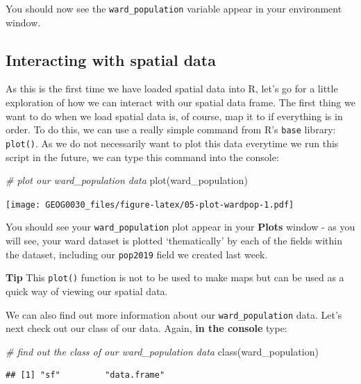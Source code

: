 \documentclass[
]{book}
\newenvironment{Shaded}{\begin{snugshade}}{\end{snugshade}}
\newcommand{\CommentTok}[1]{\textcolor[rgb]{0.56,0.35,0.01}{\textit{#1}}}
\newcommand{\FunctionTok}[1]{\textcolor[rgb]{0.00,0.00,0.00}{#1}}
\newcommand{\NormalTok}[1]{#1}
\begin{document}
You should now see the \texttt{ward\_population} variable appear in your environment window.

\hypertarget{interacting-with-spatial-data}{%
\subsection{Interacting with spatial data}\label{interacting-with-spatial-data}}

As this is the first time we have loaded spatial data into R, let's go for a little exploration of how we can interact with our spatial data frame. The first thing we want to do when we load spatial data is, of course, map it to if everything is in order. To do this, we can use a really simple command from R's \texttt{base} library: \texttt{plot()}. As we do not necessarily want to plot this data everytime we run this script in the future, we can type this command into the console:

\begin{Shaded}
\begin{Highlighting}[]
\CommentTok{\# plot our ward\_population data}
\FunctionTok{plot}\NormalTok{(ward\_population)}
\end{Highlighting}
\end{Shaded}

\texttt{[image: GEOG0030\_files/figure-latex/05-plot-wardpop-1.pdf]}

You should see your \texttt{ward\_population} plot appear in your \textbf{Plots} window - as you will see, your ward dataset is plotted `thematically' by each of the fields within the dataset, including our \texttt{pop2019} field we created last week.

\textbf{Tip}
This \texttt{plot()} function is not to be used to make maps but can be used as a quick way of viewing our spatial data.

We can also find out more information about our \texttt{ward\_population} data. Let's next check out our class of our data. Again, \textbf{in the console} type:

\begin{Shaded}
\begin{Highlighting}[]
\CommentTok{\# find out the class of our ward\_population data}
\FunctionTok{class}\NormalTok{(ward\_population)}
\end{Highlighting}
\end{Shaded}

\begin{verbatim}
## [1] "sf"         "data.frame"
\end{verbatim}
\end{document}

